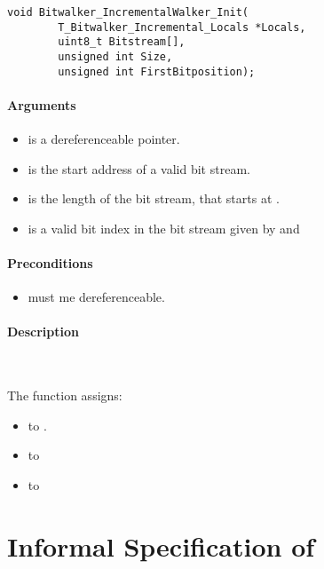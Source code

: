 \begin{lstlisting}[style=acsl-block]
void Bitwalker_IncrementalWalker_Init(
        T_Bitwalker_Incremental_Locals *Locals,
        uint8_t Bitstream[],
        unsigned int Size,
        unsigned int FirstBitposition);
\end{lstlisting}


\paragraph{Arguments}
\begin{itemize}
   \item  {} is a dereferenceable pointer.
   \item {} is  the start address of a valid bit stream.
   \item {} is the length of the bit stream, that starts at .
   \item {} is a valid bit index in the bit stream given by  and 
\end{itemize}

\paragraph{Preconditions}
\begin{itemize}
    \item  {} must me dereferenceable.
\end{itemize}

\paragraph{Description}~

The function \init assigns:
\begin{itemize}
    \item {}  to .
    \item {} to 
    \item {} to 
\end{itemize}


\clearpage

\section{Informal Specification of }

